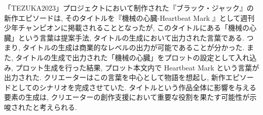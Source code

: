 \documentclass[a4j,12pt]{jsreport}
\begin{document}
「TEZUKA2023」プロジェクトにおいて制作された『ブラック・ジャック』の新作エピソードは, そのタイトルを『機械の心臓-Heartbeat Mark \MakeUppercase{} \footnotemark』として週刊少年チャンピオンに掲載されることとなったが, このタイトルにある「機械の心臓」という言葉は提案手法, タイトルの生成において出力された言葉である. つまり, タイトルの生成は商業的なレベルの出力が可能であることが分かった. また, タイトルの生成で出力された「機械の心臓」をプロットの設定として入れ込み, プロット生成を行った結果, プロット本文内で Heartbeat Mark \MakeUppercase{}という言葉が出力された. クリエーターはこの言葉を中心として物語を想起し, 新作エピソードとしてのシナリオを完成させていた. タイトルという作品全体に影響を与える要素の生成は, クリエーターの創作支援において重要な役割を果たす可能性が示唆されたと考えられる.







\end{document}
